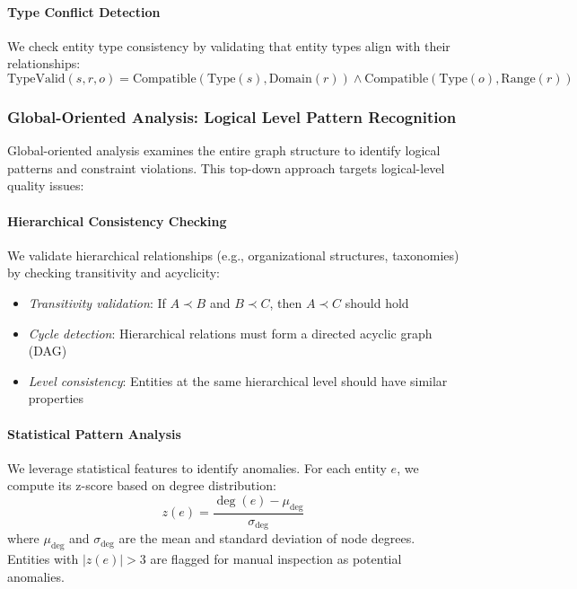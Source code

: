 \documentclass[runningheads]{llncs}
\begin{document}
\paragraph{Type Conflict Detection}
We check entity type consistency by validating that entity types align with their relationships:
\begin{equation}
\text{TypeValid}(s, r, o) = \text{Compatible}(\text{Type}(s), \text{Domain}(r)) \land \text{Compatible}(\text{Type}(o), \text{Range}(r))
\end{equation}

\subsubsection{Global-Oriented Analysis: Logical Level Pattern Recognition}

Global-oriented analysis examines the entire graph structure to identify logical patterns and constraint violations. This top-down approach targets logical-level quality issues:

\paragraph{Hierarchical Consistency Checking}
We validate hierarchical relationships (e.g., organizational structures, taxonomies) by checking transitivity and acyclicity:
\begin{itemize}
    \item \textit{Transitivity validation}: If $A \prec B$ and $B \prec C$, then $A \prec C$ should hold
    \item \textit{Cycle detection}: Hierarchical relations must form a directed acyclic graph (DAG)
    \item \textit{Level consistency}: Entities at the same hierarchical level should have similar properties
\end{itemize}

\paragraph{Statistical Pattern Analysis}
We leverage statistical features to identify anomalies. For each entity $e$, we compute its z-score based on degree distribution:
\begin{equation}
z(e) = \frac{\deg(e) - \mu_{\deg}}{\sigma_{\deg}}
\end{equation}
where $\mu_{\deg}$ and $\sigma_{\deg}$ are the mean and standard deviation of node degrees. Entities with $|z(e)| > 3$ are flagged for manual inspection as potential anomalies.
\end{document}
